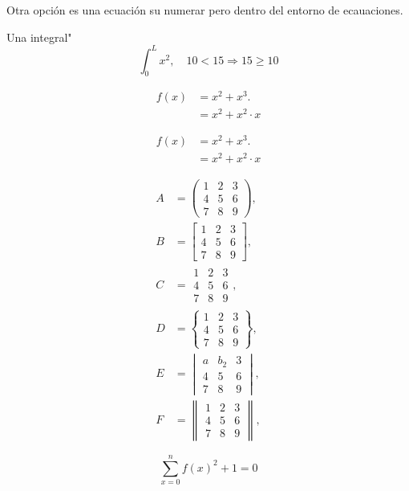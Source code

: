 \documentclass[a4paper,12pt]{article}
\begin{document}
Otra opción es una ecuación su numerar pero dentro del entorno de
ecauaciones. 

Una integral"
$$ \int_0^L x^2, \quad 10<15 \Rightarrow 15 \geq  10$$


\begin{align}
    f(x) & = x^2+x^3. \\
         & = x^2+x^2 \cdot x
\end{align}

\begin{align*}
    f(x) & = x^2+x^3. \\
         & = x^2+x^2 \cdot x
\end{align*}


\begin{align*}
    A &=
    \begin{pmatrix}
        1 & 2 & 3 \\
        4 & 5 & 6 \\
        7 & 8 & 9
    \end{pmatrix}, \\[6pt]
    B &=
    \begin{bmatrix}
        1 & 2 & 3 \\
        4 & 5 & 6 \\
        7 & 8 & 9
    \end{bmatrix}, \\[6pt]
    C &=
    \begin{matrix}
        1 & 2 & 3 \\
        4 & 5 & 6 \\
        7 & 8 & 9
    \end{matrix}, \\[6pt]
    D &=
    \begin{Bmatrix}
        1 & 2 & 3 \\
        4 & 5 & 6 \\
        7 & 8 & 9
    \end{Bmatrix}, \\[6pt]
    E &=
    \begin{vmatrix}
        a & b_2 & 3 \\
        4 & 5 & 6 \\
        7 & 8 & 9
    \end{vmatrix}, \\[6pt]
    F &=
    \begin{Vmatrix}
        1 & 2 & 3 \\
        4 & 5 & 6 \\
        7 & 8 & 9
    \end{Vmatrix},
\end{align*} 

\begin{equation}
\sum _{x=0}^{n}f{\left(x\right)}^{2}+1=0
\end{equation}
\end{document}
